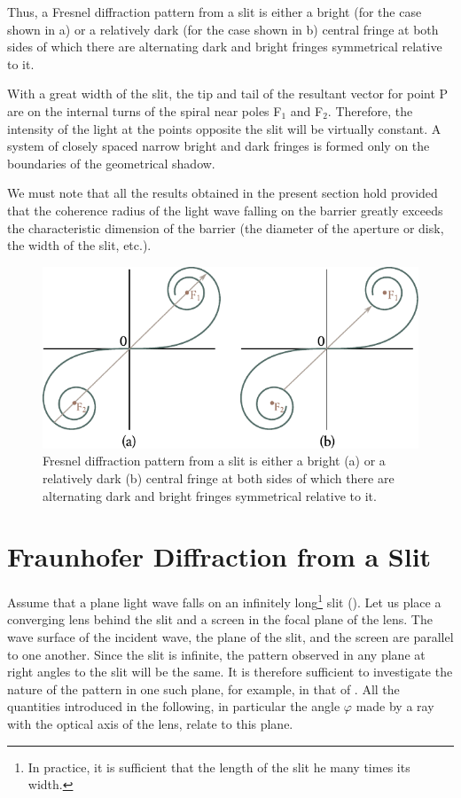 Thus, a Fresnel diffraction pattern from a slit is either a bright (for the case shown in a) or a relatively dark (for the case
shown in b) central fringe at both sides of which there are alternating dark and bright fringes symmetrical relative to it.

With a great width of the slit, the tip and tail of the resultant vector for point P are on the internal turns of the spiral near poles F$_1$ and F$_2$.
Therefore, the intensity of the light at the points opposite the slit will be virtually constant.
A system of closely spaced narrow bright and dark fringes is formed only on the boundaries of the geometrical shadow.

We must note that all the results obtained in the present section hold provided that the coherence radius of the light wave falling on the barrier greatly exceeds the characteristic dimension of the barrier (the diameter of the aperture or disk, the width of the slit, etc.).

\begin{figure}[t]
	\begin{center}
		\includegraphics[scale=1]{figures/ch_18/fig_18_25.pdf}
        \caption[]{Fresnel diffraction pattern from a slit is either a bright (a) or a relatively dark (b) central fringe at both sides of which there are alternating dark and bright fringes symmetrical relative to it.}
		\label{fig:18_25}
	\end{center}
	\vspace{-0.8cm}
\end{figure}

\section{Fraunhofer Diffraction from a Slit}\label{sec:18_5}

Assume that a plane light wave falls on an infinitely long\footnote{In practice, it is sufficient that the length of the slit he many times its width.} slit ().
Let us place a converging lens behind the slit and a screen in the focal plane of the lens.
The wave surface of the incident wave, the plane of the slit, and the screen are parallel to one
another.
Since the slit is infinite, the pattern observed in any plane at right angles to the slit will be the same.
It is therefore sufficient to investigate the nature of the pattern in one such plane, for example, in that of .
All the quantities introduced in the following, in particular the angle $\varphi$ made by a ray with the optical axis of the lens, relate to this plane.

